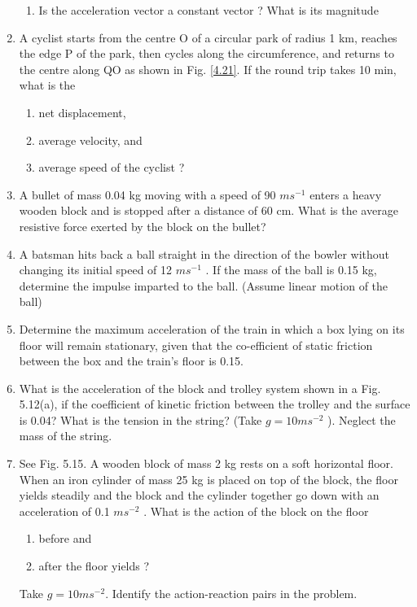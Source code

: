 \begin{enumerate}[label=\arabic*.,ref=\thesection.\theenumi]
\begin{enumerate}
\item  Is the acceleration vector a constant vector ? What is its magnitude
\end{enumerate}
\item A cyclist starts from the centre O of a circular park of radius 1 km, reaches the edge P of the park, then cycles along the circumference, and returns to the centre along QO as shown in Fig. \ref{4.21}. If the round trip takes 10 min, what is the 
\begin{enumerate}
\item  net displacement, 
\item  average velocity, and 
\item  average speed of the cyclist ?
\end{enumerate}
%
\item  A bullet of mass 0.04 kg moving with a speed of 90 $m s^{-1}$
enters a
heavy wooden block and is stopped after a distance of 60 cm. What is the average resistive force exerted by the block on the bullet?
\item A batsman hits back a ball straight in the direction of the bowler without changing its initial speed of 12 $m s^{-1}$
.
If the mass of the ball is 0.15 kg, determine the impulse imparted to the ball. (Assume linear motion of the ball)
\item Determine the maximum acceleration of the train in which a box lying on its floor will remain stationary, given that the co-efficient of static friction between the box and the train’s floor is 0.15.
\item What is the acceleration of the block and trolley system shown in a Fig. 5.12(a), if the coefficient of kinetic friction between the trolley and the surface is 0.04? What is the tension in the string? (Take $g = 10 m s^{-2}$
). Neglect the mass of the string.
\item See Fig. 5.15. A wooden block of mass 2 kg rests on a soft horizontal floor. When an iron cylinder of mass 25 kg is placed on top of the block, the floor yields steadily and the block and the cylinder together go down with an acceleration of 0.1 $m s^{-2}$
. What is the action of the block
on the floor 
\begin{enumerate}
\item  before and 
\item  after the floor yields ? 
\end{enumerate}
Take $g = 10 m s^{-2}$. Identify the action-reaction pairs in the problem.
\end{enumerate}
